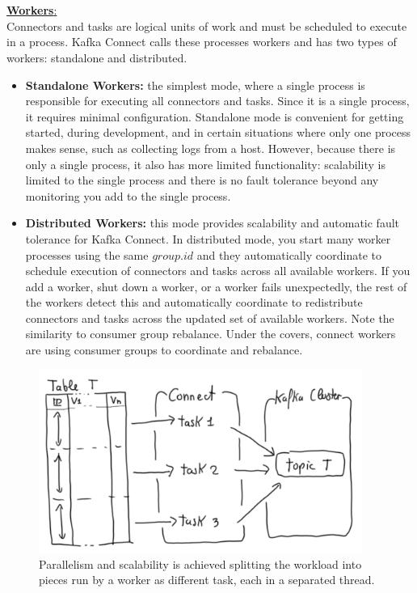 \documentclass[10pt,a4paper]{article}
\newcommand{\nline}{\\~\\}
\begin{document}
\nline
\uline{\textbf{Workers}:} \\
Connectors and tasks are logical units of work and must be scheduled to execute in a process. Kafka Connect calls these processes workers and has two types of workers: standalone and distributed.
\begin{itemize}
	\item \textbf{Standalone Workers:} the simplest mode, where a single process is responsible for executing all connectors and tasks. Since it is a single process, it requires minimal configuration. Standalone mode is convenient for getting started, during development, and in certain situations where only one process makes sense, such as collecting logs from a host. However, because there is only a single process, it also has more limited functionality: scalability is limited to the single process and there is no fault tolerance beyond any monitoring you add to the single process.
	\item \textbf{Distributed Workers:} this mode provides scalability and automatic fault tolerance for Kafka Connect. In distributed mode, you start many worker processes using the same $group.id$ and they automatically coordinate to schedule execution of connectors and tasks across all available workers. If you add a worker, shut down a worker, or a worker fails unexpectedly, the rest of the workers detect this and automatically coordinate to redistribute connectors and tasks across the updated set of available workers. Note the similarity to consumer group rebalance. Under the covers, connect workers are using consumer groups to coordinate and rebalance.
\end{itemize}
\begin{figure}[ht!]
 \hfill \includegraphics[width=300pt]{images/kafka-tasks-workers}\hspace*{\fill}
 \caption{Parallelism and scalability is achieved splitting the workload into pieces run by a worker as different task, each in a separated thread.}
\end{figure} 
\end{document}
